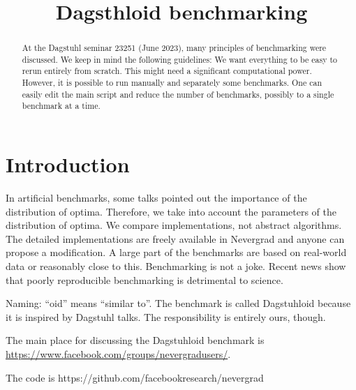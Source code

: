 \documentclass{article}
\begin{document}
\title{Dagsthloid benchmarking}

\maketitle

\tableofcontents

\begin{abstract}
At the Dagstuhl seminar 23251 (June 2023), many principles of benchmarking were discussed.
We keep in mind the following guidelines:
We want everything to be easy to rerun entirely from scratch. This might need a significant computational power.
However, it is possible to run manually and separately some benchmarks. One can easily edit the main script and reduce the number of benchmarks, possibly to a single benchmark at a time.


\end{abstract}

\section{Introduction}

In artificial benchmarks, some talks pointed out the importance of the distribution of optima. Therefore, we take into account the parameters of the distribution of optima.
We compare implementations, not abstract algorithms. The detailed implementations are freely available in Nevergrad and anyone can propose a modification.
A large part of the benchmarks are based on real-world data or reasonably close to this.
Benchmarking is not a joke. Recent news show that poorly reproducible benchmarking is detrimental to science.

Naming: “oid” means “similar to”. The benchmark is called Dagstuhloid because it is inspired by Dagstuhl talks. The responsibility is entirely ours, though.

The main place for discussing the Dagstuhloid benchmark is \url{https://www.facebook.com/groups/nevergradusers/}. 

The code is https://github.com/facebookresearch/nevergrad
\end{document}
